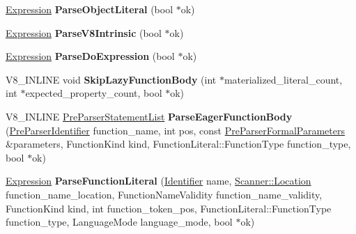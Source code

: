 \begin{DoxyCompactItemize}
\item 
\hyperlink{classv8_1_1internal_1_1_pre_parser_expression}{Expression} {\bfseries Parse\+Object\+Literal} (bool $\ast$ok)\hypertarget{classv8_1_1internal_1_1_pre_parser_a02d2216ca2fab648197dee5d5bf9307c}{}\label{classv8_1_1internal_1_1_pre_parser_a02d2216ca2fab648197dee5d5bf9307c}

\item 
\hyperlink{classv8_1_1internal_1_1_pre_parser_expression}{Expression} {\bfseries Parse\+V8\+Intrinsic} (bool $\ast$ok)\hypertarget{classv8_1_1internal_1_1_pre_parser_a67a4413b0efd2bb0e32c4afd4e75de32}{}\label{classv8_1_1internal_1_1_pre_parser_a67a4413b0efd2bb0e32c4afd4e75de32}

\item 
\hyperlink{classv8_1_1internal_1_1_pre_parser_expression}{Expression} {\bfseries Parse\+Do\+Expression} (bool $\ast$ok)\hypertarget{classv8_1_1internal_1_1_pre_parser_a1eb2f83723e78c3716b71825b4767707}{}\label{classv8_1_1internal_1_1_pre_parser_a1eb2f83723e78c3716b71825b4767707}

\item 
V8\+\_\+\+I\+N\+L\+I\+NE void {\bfseries Skip\+Lazy\+Function\+Body} (int $\ast$materialized\+\_\+literal\+\_\+count, int $\ast$expected\+\_\+property\+\_\+count, bool $\ast$ok)\hypertarget{classv8_1_1internal_1_1_pre_parser_a7e31eac97682b19a134aa39aa205466d}{}\label{classv8_1_1internal_1_1_pre_parser_a7e31eac97682b19a134aa39aa205466d}

\item 
V8\+\_\+\+I\+N\+L\+I\+NE \hyperlink{classv8_1_1internal_1_1_pre_parser_list}{Pre\+Parser\+Statement\+List} {\bfseries Parse\+Eager\+Function\+Body} (\hyperlink{classv8_1_1internal_1_1_pre_parser_identifier}{Pre\+Parser\+Identifier} function\+\_\+name, int pos, const \hyperlink{structv8_1_1internal_1_1_pre_parser_formal_parameters}{Pre\+Parser\+Formal\+Parameters} \&parameters, Function\+Kind kind, Function\+Literal\+::\+Function\+Type function\+\_\+type, bool $\ast$ok)\hypertarget{classv8_1_1internal_1_1_pre_parser_a335f4ab7b14c7027569f6ecc68757876}{}\label{classv8_1_1internal_1_1_pre_parser_a335f4ab7b14c7027569f6ecc68757876}

\item 
\hyperlink{classv8_1_1internal_1_1_pre_parser_expression}{Expression} {\bfseries Parse\+Function\+Literal} (\hyperlink{classv8_1_1internal_1_1_pre_parser_identifier}{Identifier} name, \hyperlink{structv8_1_1internal_1_1_scanner_1_1_location}{Scanner\+::\+Location} function\+\_\+name\+\_\+location, Function\+Name\+Validity function\+\_\+name\+\_\+validity, Function\+Kind kind, int function\+\_\+token\+\_\+pos, Function\+Literal\+::\+Function\+Type function\+\_\+type, Language\+Mode language\+\_\+mode, bool $\ast$ok)\hypertarget{classv8_1_1internal_1_1_pre_parser_a0ac32401a156007a5c031acf2e7191c7}{}\label{classv8_1_1internal_1_1_pre_parser_a0ac32401a156007a5c031acf2e7191c7}


\end{DoxyCompactItemize}
